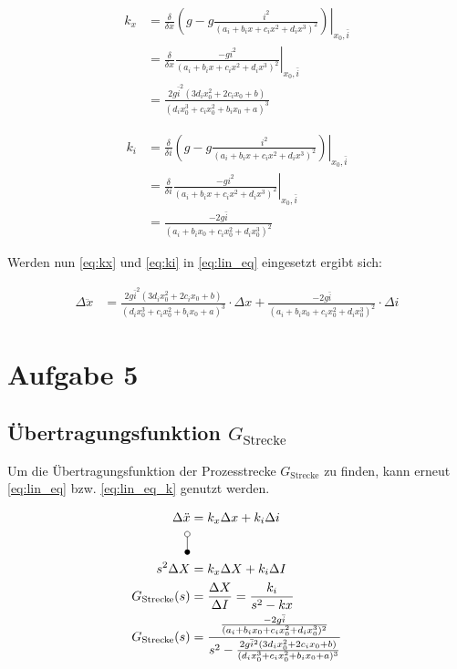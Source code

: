 	\begin{align} \label{eq:kx}
		k_x &= \left. \frac{\delta}{\delta x}  \left( g-g\frac{i^2}{(a_i+b_ix+c_ix^2+d_ix^3)^2} \right) \right|_{x_0, \bar{i}} \nonumber \\
			&= \left. \frac{\delta}{\delta x} \frac{-gi^2}{(a_i+b_ix+c_ix^2+d_ix^3)^2} \right|_{x_0,\bar{i}}  \nonumber \\
			&= \frac{2g\bar{i}^2(3d_ix_0^2 + 2c_ix_0+b)}{(d_ix_0^3+c_ix_0^2+b_ix_0+a)^3} 
	\end{align} 

	\begin{align} \label{eq:ki}
		k_i &= \left. \frac{\delta}{\delta i}  \left( g-g\frac{i^2}{(a_i+b_ix+c_ix^2+d_ix^3)^2} \right) \right|_{x_0, \bar{i}} \nonumber \\
			&= \left. \frac{\delta}{\delta i} \frac{-gi^2}{(a_i+b_ix+c_ix^2+d_ix^3)^2} \right|_{x_0,\bar{i}}  \nonumber \\
			&= \frac{-2g\bar{i}}{(a_i + b_ix_0 +c_ix_0^2 + d_ix_0^3)^2}
	\end{align} 

	Werden nun \autoref{eq:kx} und \ref{eq:ki} in \autoref{eq:lin_eq} eingesetzt ergibt sich:

	\begin{align}\label{eq:lin_eq_k} 
		\Delta\ddot{x} &= \frac{2g\bar{i}^2(3d_ix_0^2 + 2c_ix_0+b)}{(d_ix_0^3+c_ix_0^2+b_ix_0+a)^3}  \cdot \Delta x + \frac{-2g\bar{i}}{(a_i + b_ix_0 +c_ix_0^2 + d_ix_0^3)^2} \cdot \Delta i 
	\end{align} 

\section{Aufgabe 5}\label{sec:Aufgabe5}
	\subsection*{Übertragungsfunktion $G_{\mathrm{Strecke}}$ }\label{sub:transfer_Gstrecke}
	Um die Übertragungsfunktion der Prozesstrecke $G_{\mathrm{Strecke}}$ zu finden, kann erneut \autoref{eq:lin_eq} bzw. \autoref{eq:lin_eq_k} genutzt werden.


	\begin{align}\label{eq:G_strecke} 
		\Delta \ddot{x} &= k_x \Delta x + k_i \Delta i \nonumber\\
		\laplace \nonumber \\
		s^2 \Delta X &= k_x \Delta X + k_i \Delta I  \notag  \\
		G_{\mathrm{Strecke}}(s) &= \frac{\Delta X}{\Delta I} = \frac{k_i}{s^2-kx} \nonumber\\
		G_{\mathrm{Strecke}}(s) &= \frac{\frac{-2g\bar{i}}{(a_i + b_ix_0 +c_ix_0^2 + d_ix_0^3)^2}}{s^2-\frac{2g\bar{i}^2(3d_ix_0^2 + 2c_ix_0+b)}{(d_ix_0^3+c_ix_0^2+b_ix_0+a)^3}}
	\end{align}

